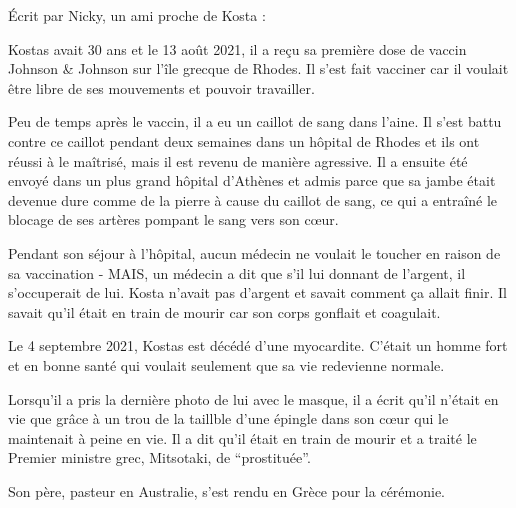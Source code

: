 Écrit par Nicky, un ami proche de Kosta :

Kostas avait 30 ans et le 13 août 2021, il a reçu sa première dose de vaccin
Johnson \& Johnson sur l'île grecque de Rhodes. Il s'est fait vacciner car il
voulait être libre de ses mouvements et pouvoir travailler.

Peu de temps après le vaccin, il a eu un caillot de sang dans l'aine. Il s'est
battu contre ce caillot pendant deux semaines dans un hôpital de Rhodes et ils
ont réussi à le maîtrisé, mais il est revenu de manière agressive. Il a ensuite
été envoyé dans un plus grand hôpital d'Athènes et admis parce que sa jambe
était devenue dure comme de la pierre à cause du caillot de sang, ce qui a
entraîné le blocage de ses artères pompant le sang vers son cœur.

Pendant son séjour à l'hôpital, aucun médecin ne voulait le toucher en raison de
sa vaccination - MAIS, un médecin a dit que s'il lui donnant de l'argent, il
s'occuperait de lui. Kosta n'avait pas d'argent et savait comment ça allait
finir. Il savait qu'il était en train de mourir car son corps gonflait et
coagulait.

Le 4 septembre 2021, Kostas est décédé d'une myocardite. C'était un homme fort
et en bonne santé qui voulait seulement que sa vie redevienne normale.

Lorsqu'il a pris la dernière photo de lui avec le masque, il a écrit qu'il
n'était en vie que grâce à un trou de la taillble d'une épingle dans son cœur
qui le maintenait à peine en vie. Il a dit qu'il était en train de mourir et a
traité le Premier ministre grec, Mitsotaki, de “prostituée”.

Son père, pasteur en Australie, s'est rendu en Grèce pour la cérémonie.


